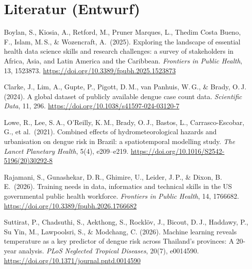 \documentclass[11pt,a4paper]{article}
\begin{document}
\section*{Literatur (Entwurf)}
\begin{small}
\begin{description}[nosep,leftmargin=1em,labelindent=0pt]
\item Boylan, S., Kiosia, A., Retford, M., Pruner Marques, L., Thedim Costa Bueno, F.,
  Islam, M.\,S., \& Wozencraft, A.\ (2025). Exploring the landscape of essential
  health data science skills and research challenges: a survey of stakeholders in
  Africa, Asia, and Latin America and the Caribbean. \emph{Frontiers in Public
  Health}, 13, 1523873. \url{https://doi.org/10.3389/fpubh.2025.1523873}
\item Clarke, J., Lim, A., Gupte, P., Pigott, D.\,M., van Panhuis, W.\,G., \&
  Brady, O.\,J. (2024). A global dataset of publicly available dengue case count
  data. \emph{Scientific Data}, 11, 296.
  \url{https://doi.org/10.1038/s41597-024-03120-7}
\item Lowe, R., Lee, S.\,A., O'Reilly, K.\,M., Brady, O.\,J., Bastos, L.,
  Carrasco-Escobar, G., et al.\ (2021). Combined effects of hydrometeorological
  hazards and urbanisation on dengue risk in Brazil: a spatiotemporal modelling
  study. \emph{The Lancet Planetary Health}, 5(4), e209--e219.
  \url{https://doi.org/10.1016/S2542-5196(20)30292-8}
\item Rajamani, S., Gunashekar, D.\,R., Ghimire, U., Leider, J.\,P., \& Dixon, B.\,E.\
  (2026). Training needs in data, informatics and technical skills in the US
  governmental public health workforce. \emph{Frontiers in Public Health}, 14,
  1766682. \url{https://doi.org/10.3389/fpubh.2026.1766682}
\item Suttirat, P., Chadsuthi, S., Aekthong, S., Rocklöv, J., Bicout, D.\,J.,
  Haddawy, P., Su Yin, M., Lawpoolsri, S., \& Modchang, C. (2026). Machine
  learning reveals temperature as a key predictor of dengue risk across
  Thailand's provinces: A 20-year analysis. \emph{PLoS Neglected Tropical
  Diseases}, 20(7), e0014590.
  \url{https://doi.org/10.1371/journal.pntd.0014590}
\end{description}
\end{small}
\end{document}
